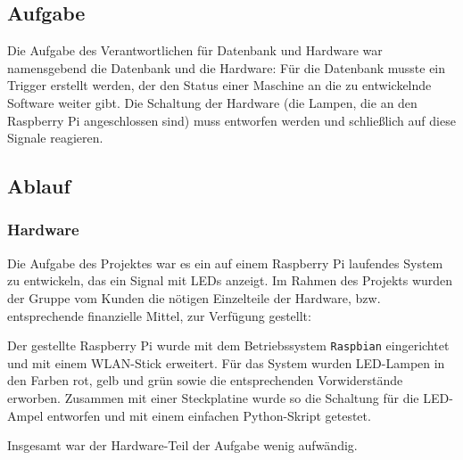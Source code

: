 \subsection{Aufgabe}

Die Aufgabe des Verantwortlichen für Datenbank und Hardware war namensgebend die Datenbank und die Hardware: Für die Datenbank musste ein Trigger erstellt werden, der den Status einer Maschine an die zu entwickelnde Software weiter gibt. Die Schaltung der Hardware (die Lampen, die an den Raspberry Pi angeschlossen sind) muss entworfen werden und schließlich auf diese Signale reagieren.

\subsection{Ablauf}

\subsubsection{Hardware}
Die Aufgabe des Projektes war es ein auf einem Raspberry Pi laufendes System zu entwickeln, das ein Signal mit LEDs anzeigt. Im Rahmen des Projekts wurden der Gruppe vom Kunden die nötigen Einzelteile der Hardware, bzw. entsprechende finanzielle Mittel, zur Verfügung gestellt:
 
Der gestellte Raspberry Pi wurde mit dem Betriebssystem \texttt{Raspbian} eingerichtet und mit einem WLAN-Stick erweitert. Für das System wurden LED-Lampen in den Farben rot, gelb und grün sowie die entsprechenden Vorwiderstände erworben. Zusammen mit einer Steckplatine wurde so die Schaltung für die LED-Ampel entworfen und mit einem einfachen Python-Skript getestet. 

Insgesamt war der Hardware-Teil der Aufgabe wenig aufwändig.

